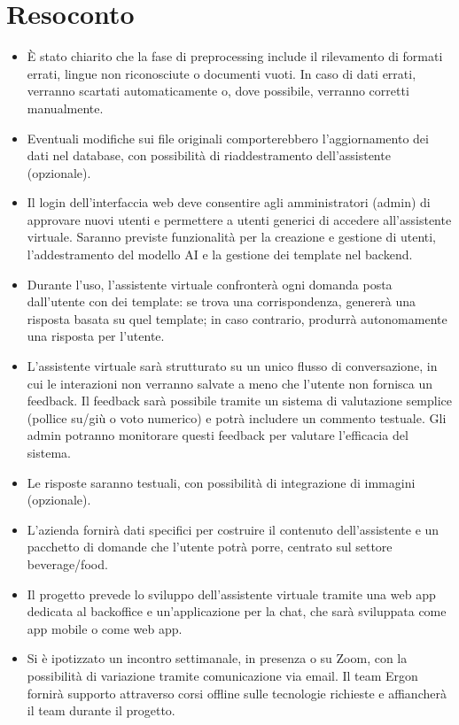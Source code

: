 \documentclass{TWReport}
\begin{document}
\section*{Resoconto}
\begin{itemize}
    \item È stato chiarito che la fase di preprocessing include il rilevamento di formati errati, lingue non riconosciute o documenti vuoti. In caso di dati errati, verranno scartati automaticamente o, dove possibile, verranno corretti manualmente.
    \item Eventuali modifiche sui file originali comporterebbero l’aggiornamento dei dati nel database, con possibilità di riaddestramento dell'assistente (opzionale).
    \item Il login dell'interfaccia web deve consentire agli amministratori (admin) di approvare nuovi utenti e permettere a utenti generici di accedere all’assistente virtuale. Saranno previste funzionalità per la creazione e gestione di utenti, l'addestramento del modello AI e la gestione dei template nel backend.
    \item Durante l’uso, l'assistente virtuale confronterà ogni domanda posta dall'utente con dei template: se trova una corrispondenza, genererà una risposta basata su quel template; in caso contrario, produrrà autonomamente una risposta per l’utente.
    \item L’assistente virtuale sarà strutturato su un unico flusso di conversazione, in cui le interazioni non verranno salvate a meno che l'utente non fornisca un feedback. Il feedback sarà possibile tramite un sistema di valutazione semplice (pollice su/giù o voto numerico) e potrà includere un commento testuale. Gli admin potranno monitorare questi feedback per valutare l’efficacia del sistema.
    \item Le risposte saranno testuali, con possibilità di integrazione di immagini (opzionale).
    \item L'azienda fornirà dati specifici per costruire il contenuto dell'assistente e un pacchetto di domande che l’utente potrà porre, centrato sul settore beverage/food.
    \item Il progetto prevede lo sviluppo dell’assistente virtuale tramite una web app dedicata al backoffice e un’applicazione per la chat, che sarà sviluppata come app mobile o come web app.
    \item Si è ipotizzato un incontro settimanale, in presenza o su Zoom, con la possibilità di variazione tramite comunicazione via email. Il team Ergon fornirà supporto attraverso corsi offline sulle tecnologie richieste e affiancherà il team durante il progetto.
\end{itemize}

\signature{L'Azienda Proponente}
\end{document}
